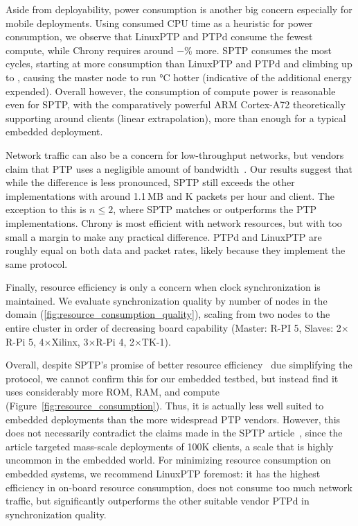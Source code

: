 

Aside from deployability, power consumption is another big concern especially for mobile deployments. Using consumed CPU time as a heuristic for power consumption, we observe that LinuxPTP and PTPd consume the fewest compute, while Chrony requires around $-$\% more. SPTP consumes the most cycles, starting at  more consumption than LinuxPTP and PTPd and climbing up to , causing the master node to run °C hotter (indicative of the additional energy expended). Overall however, the consumption of compute power is reasonable even for SPTP, with the comparatively powerful ARM Cortex-A72 theoretically supporting around  clients (linear extrapolation), more than enough for a typical embedded deployment.

Network traffic can also be a concern for low-throughput networks, but vendors claim that PTP uses a negligible amount of bandwidth~\cite{ptp-onestep-twostep-five-minute-facts}. Our results suggest that while the difference is less pronounced, SPTP still exceeds the other implementations with around 1.1\,MB and K packets per hour and client. The exception to this is $n\leq2$, where SPTP matches or outperforms the PTP implementations. Chrony is most efficient with network resources, but with too small a margin to make any practical difference. PTPd and LinuxPTP are roughly equal on both data and packet rates, likely because they implement the same protocol.

Finally, resource efficiency is only a concern when clock synchronization is maintained. We evaluate synchronization quality by number of nodes in the domain (\cref{fig:resource_consumption_quality}), scaling from two nodes to the entire cluster in order of decreasing board capability (Master: R-PI 5, Slaves: 2$\times$R-Pi 5, 4$\times$Xilinx, 3$\times$R-Pi 4, 2$\times$TK-1). 

Overall, despite SPTP's promise of better resource efficiency~\cite{sptp} due simplifying the protocol, we cannot confirm this for our embedded testbed, but instead find it uses considerably more ROM, RAM, and compute (Figure~\ref{fig:resource_consumption}). Thus, it is actually less well suited to embedded deployments than the more widespread PTP vendors. However, this does not necessarily contradict the claims made in the SPTP article~\cite{sptp}, since the article targeted mass-scale deployments of 100K clients, a scale that is highly uncommon in the embedded world. For minimizing resource consumption on embedded systems, we recommend LinuxPTP foremost: it has the highest efficiency in on-board resource consumption, does not consume too much network traffic, but significantly outperforms the other suitable vendor PTPd in synchronization quality.
